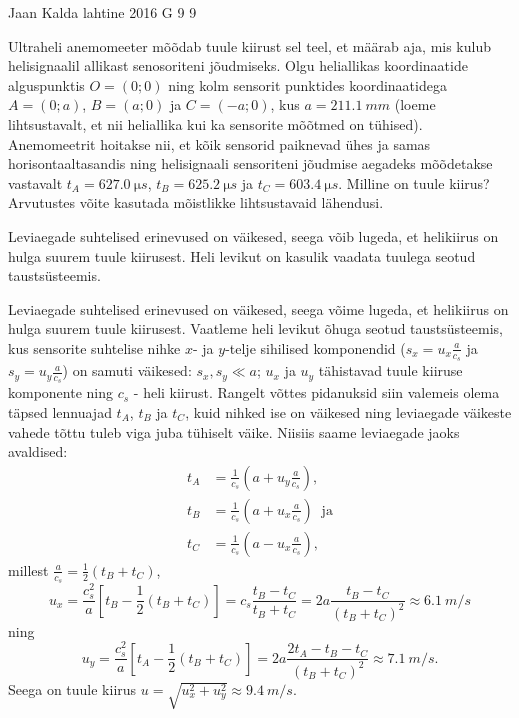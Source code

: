 {Jaan Kalda} %
{lahtine} %
{2016} %
{G 9} %
{9} %
{
\ifStatement
Ultraheli anemomeeter mõõdab tuule kiirust sel teel, et määrab aja, mis kulub helisignaalil allikast senosoriteni jõudmiseks.
Olgu heliallikas koordinaatide alguspunktis $O=(0;0)$ ning kolm sensorit punktides koordinaatidega $A=(0;a)$, $B=(a;0)$ ja $C=(-a;0)$, 
kus $a=\SI{211.1}{mm}$ (loeme lihtsustavalt, et nii heliallika kui ka sensorite mõõtmed on tühised). 
Anemomeetrit hoitakse nii, et kõik sensorid paiknevad ühes ja samas horisontaaltasandis ning helisignaali 
sensoriteni jõudmise aegadeks mõõdetakse vastavalt $t_A=\SI{627,0}{\micro s}$, $t_B=\SI{625,2}{\micro s}$ ja $t_C=\SI{603,4}{\micro s}$. 
Milline on tuule kiirus? Arvutustes võite kasutada mõistlikke lihtsustavaid lähendusi.
\fi


\ifHint
Leviaegade suhtelised erinevused on väikesed, seega võib lugeda, et helikiirus on hulga suurem tuule kiirusest. Heli levikut on kasulik vaadata tuulega seotud taustsüsteemis.
\fi


\ifSolution
Leviaegade suhtelised erinevused on väikesed, seega võime lugeda, et helikiirus on hulga suurem tuule kiirusest.
Vaatleme heli levikut õhuga seotud taustsüsteemis, kus sensorite suhtelise nihke $x$- ja $y$-telje sihilised komponendid ($s_x=u_x\frac a{c_s}$ ja  
$s_y=u_y\frac a{c_s}$) on samuti väikesed: $s_x, s_y\ll a$; $u_x$ ja $u_y$ tähistavad tuule kiiruse komponente ning $c_s$ - heli kiirust.
Rangelt võttes pidanuksid siin valemeis olema täpsed lennuajad $t_A$, $t_B$ ja $t_C$, kuid nihked ise on väikesed ning leviaegade 
väikeste vahede tõttu tuleb viga juba tühiselt väike. Niisiis saame leviaegade jaoks avaldised:
\begin{align*}
t_A&=\frac 1{c_s}\left(a+u_y\frac a{c_s}\right),\\
t_B&=\frac 1{c_s}\left(a+u_x\frac a{c_s}\right)\;\; \mbox{ja}\\
t_C&=\frac 1{c_s}\left(a-u_x\frac a{c_s}\right),
\end{align*}
millest $ \frac a{c_s}=\frac 12(t_B+t_C)$, $$u_x=\frac {c_s^2}a\left[t_B-\frac 12(t_B+t_C)\right]=c_s\frac{t_B-t_C}{t_B+t_C}=2a\frac{t_B-t_C}{(t_B+t_C)^2}\approx \SI{6.1}{m/s}$$
ning 
$$u_y=\frac {c_s^2}a\left[t_A-\frac 12(t_B+t_C)\right]=2a\frac{2t_A-t_B-t_C}{(t_B+t_C)^2}\approx \SI{7.1}{m/s}.$$
Seega on tuule kiirus $u=\sqrt{u_x^2+u_y^2}\approx \SI{9.4}{m/s}$.
\fi


}
